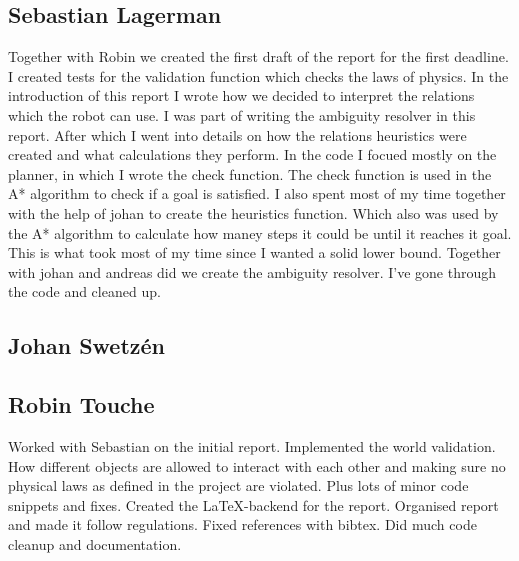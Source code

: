 \subsection*{Sebastian Lagerman}
Together with Robin we created the first draft of the report for the first deadline.
\newline
\newline
I created tests for the validation function which checks the laws of physics.
\newline
\newline
In the introduction of this report I wrote how we decided to interpret the relations which the robot can use.
I was part of writing the ambiguity resolver in this report.
After which I went into details on how the relations heuristics were created and what calculations they perform.
\newline
\newline
In the code I focued mostly on the planner, in which I wrote the check function.
The check function is used in the A* algorithm to check if a goal is satisfied.
I also spent most of my time together with the help of johan to create the heuristics function.
Which also was used by the A* algorithm to calculate how maney steps it could be until it reaches it goal.
This is what took most of my time since I wanted a solid lower bound.
Together with johan and andreas did we create the ambiguity resolver.
I've gone through the code and cleaned up.


\subsection*{Johan Swetz\'en}
\subsection*{Robin Touche}
Worked with Sebastian on the initial report.
\newline
\newline
Implemented the world validation.
How different objects are allowed to interact with each other and making sure no physical laws as defined in the project are violated.
Plus lots of minor code snippets and fixes.
\newline
\newline
Created the \LaTeX-backend for the report.
Organised report and made it follow regulations.
Fixed references with bibtex.
\newline
\newline
Did much code cleanup and documentation.
